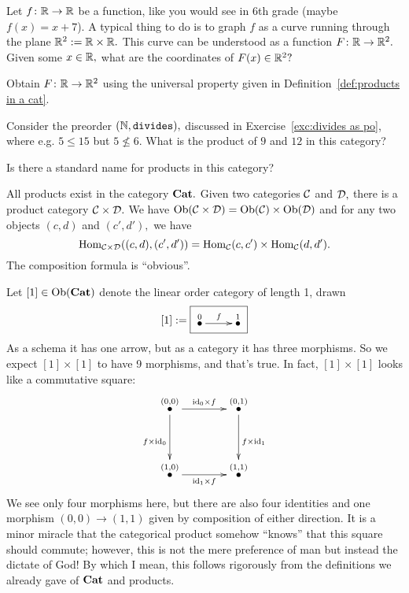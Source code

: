 \documentclass[CT4S-EN-RU]{subfiles}
\begin{document}
\begin{exerciseRUS}
\end{exerciseRUS}

\begin{exerciseENG}
Let $f\colon{\mathbb R}\rightarrow{\mathbb R}$ be a function, like you would see in 6th grade (maybe $f(x)=x+7$). A typical thing to do is to graph $f$ as a curve running through the plane ${\mathbb R}^2:={\mathbb R}\times{\mathbb R}.$ This curve can be understood as a function $F\colon{\mathbb R}\rightarrow{\mathbb R}^2.$
\sexc Given some $x\in{\mathbb R},$ what are the coordinates of $F(x)\in{\mathbb R}^2?$ 
\item Obtain $F\colon{\mathbb R}\rightarrow{\mathbb R}^2$ using the universal property given in Definition~\ref{def:products in a cat}. 
\endsexc
\end{exerciseENG}

\begin{exerciseRUS}
\end{exerciseRUS}

\begin{exerciseENG}
Consider the preorder $({\mathbb N},{\tt divides}),$ discussed in Exercise~\ref{exc:divides as po}, where e.g. $5\leq 15$ but $5\not\leq 6.$ \sexc What is the product of $9$ and $12$ in this category?
\item Is there a standard name for products in this category?
\endsexc
\end{exerciseENG}

\begin{exerciseRUS}
\end{exerciseRUS}

\begin{exampleENG}\label{ex:[1]x[1]}
All products exist in the category ${\mathbf{Cat}}.$ Given two categories $\mathcal{C}$ and $\mathcal{D},$ there is a product category $\mathcal{C}\times\mathcal{D}.$ We have $\textnormal{Ob}(\mathcal{C}\times\mathcal{D})=\textnormal{Ob}(\mathcal{C})\times\textnormal{Ob}(\mathcal{D})$ and for any two objects $(c,d)$ and $(c',d'),$ we have $$\textnormal{Hom}_{\mathcal{C}\times\mathcal{D}}((c,d),(c',d'))=\textnormal{Hom}_\mathcal{C}(c,c')\times\textnormal{Hom}_\mathcal{C}(d,d').$$ The composition formula is “obvious”.

Let $[1]\in\textnormal{Ob}({\mathbf{Cat}})$ denote the linear order category of length 1, drawn $$[1]:=\fbox{\xymatrix{\LMO{0}\ar[r]^f&\LMO{1}}}$$ As a schema it has one arrow, but as a category it has three morphisms. So we expect $[1]\times[1]$ to have 9 morphisms, and that's true. In fact, $[1]\times[1]$ looks like a commutative square:
\begin{align}\label{dia:comm square}
\xymatrix@=40pt{
\LMO{(0,0)}\ar[r]^{\id_0\times f}\ar[d]_{f\times\id_0}&\LMO{(0,1)}\ar[d]^{f\times\id_1}\\
\LMO{(1,0)}\ar[r]_{\id_1\times f}&\LMO{(1,1)}}
\end{align}
We see only four morphisms here, but there are also four identities and one morphism $(0,0)\to(1,1)$ given by composition of either direction. It is a minor miracle that the categorical product somehow “knows” that this square should commute; however, this is not the mere preference of man but instead the dictate of God! By which I mean, this follows rigorously from the definitions we already gave of ${\mathbf{Cat}}$ and products.
\end{exampleENG}
\end{document}
